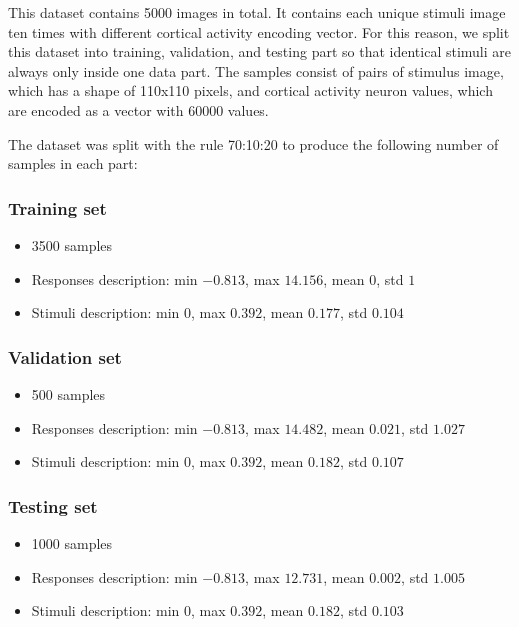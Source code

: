 This dataset contains 5000 images in total. It contains each unique stimuli image ten times with different cortical activity encoding vector. For this reason, we split this dataset into training, validation, and testing part so that identical stimuli are always only inside one data part.
The samples consist of pairs of stimulus image, which has a shape of 110x110 pixels, and cortical activity neuron values, which are encoded as a vector with 60000 values.

The dataset was split with the rule 70:10:20 to produce the following number of samples in each part:


\subsubsection{Training set}
\begin{itemize}
\item 3500 samples
\item Responses description: min $-0.813$, max $14.156$, mean $0$, std $1$
\item Stimuli description: min $0$, max $0.392$, mean $0.177$, std $0.104$
\end{itemize}


\subsubsection{Validation set}
\begin{itemize}
\item 500 samples
\item Responses description: min $-0.813$, max $14.482$, mean $0.021$, std $1.027$
\item Stimuli description: min $0$, max $0.392$, mean $0.182$, std $0.107$
\end{itemize}


\subsubsection{Testing set}
\begin{itemize}
\item 1000 samples
\item Responses description: min $-0.813$, max $12.731$, mean $0.002$, std $1.005$
\item Stimuli description: min $0$, max $0.392$, mean $0.182$, std $0.103$
\end{itemize}



